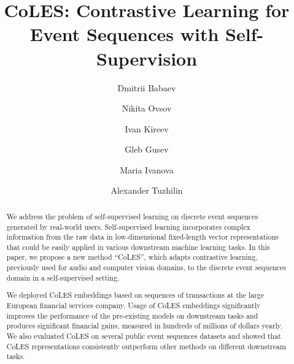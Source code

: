 \documentclass[sigconf, anonymous]{acmart}
\begin{document}
\title{CoLES: Contrastive Learning for Event Sequences with Self-Supervision}

\author{Dmitrii Babaev} 


\author{Nikita Ovsov} 

\author{Ivan Kireev} 

\author{Gleb Gusev}

\author{Maria Ivanova}

\author{Alexander Tuzhilin}

\begin{abstract}
We address the problem of self-supervised learning on discrete event sequences generated by real-world users. Self-supervised learning incorporates complex information from the raw data in low-dimensional fixed-length vector representations that could be easily applied in various downstream machine learning tasks. In this paper, we propose a new method ``CoLES'', which adapts contrastive learning, previously used for audio and computer vision domains, to the discrete event sequences domain in a self-supervised setting.

We deployed CoLES embeddings based on sequences of transactions at the large European financial services company. Usage of CoLES embeddings significantly improves the performance of the pre-existing models on downstream tasks and produces significant financial gains, measured in hundreds of millions of dollars yearly.
% 
We also evaluated CoLES on several public event sequences datasets and showed that CoLES representations consistently outperform other methods on different downstream tasks.
\end{abstract}
\end{document}
